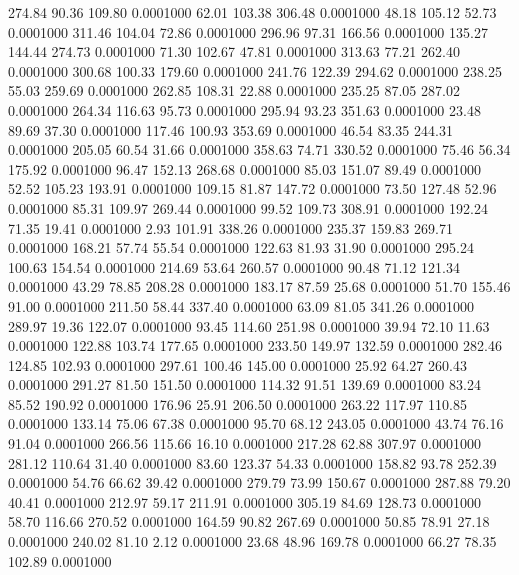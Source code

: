  274.84   90.36  109.80   0.0001000
  62.01  103.38  306.48   0.0001000
  48.18  105.12   52.73   0.0001000
 311.46  104.04   72.86   0.0001000
 296.96   97.31  166.56   0.0001000
 135.27  144.44  274.73   0.0001000
  71.30  102.67   47.81   0.0001000
 313.63   77.21  262.40   0.0001000
 300.68  100.33  179.60   0.0001000
 241.76  122.39  294.62   0.0001000
 238.25   55.03  259.69   0.0001000
 262.85  108.31   22.88   0.0001000
 235.25   87.05  287.02   0.0001000
 264.34  116.63   95.73   0.0001000
 295.94   93.23  351.63   0.0001000
  23.48   89.69   37.30   0.0001000
 117.46  100.93  353.69   0.0001000
  46.54   83.35  244.31   0.0001000
 205.05   60.54   31.66   0.0001000
 358.63   74.71  330.52   0.0001000
  75.46   56.34  175.92   0.0001000
  96.47  152.13  268.68   0.0001000
  85.03  151.07   89.49   0.0001000
  52.52  105.23  193.91   0.0001000
 109.15   81.87  147.72   0.0001000
  73.50  127.48   52.96   0.0001000
  85.31  109.97  269.44   0.0001000
  99.52  109.73  308.91   0.0001000
 192.24   71.35   19.41   0.0001000
   2.93  101.91  338.26   0.0001000
 235.37  159.83  269.71   0.0001000
 168.21   57.74   55.54   0.0001000
 122.63   81.93   31.90   0.0001000
 295.24  100.63  154.54   0.0001000
 214.69   53.64  260.57   0.0001000
  90.48   71.12  121.34   0.0001000
  43.29   78.85  208.28   0.0001000
 183.17   87.59   25.68   0.0001000
  51.70  155.46   91.00   0.0001000
 211.50   58.44  337.40   0.0001000
  63.09   81.05  341.26   0.0001000
 289.97   19.36  122.07   0.0001000
  93.45  114.60  251.98   0.0001000
  39.94   72.10   11.63   0.0001000
 122.88  103.74  177.65   0.0001000
 233.50  149.97  132.59   0.0001000
 282.46  124.85  102.93   0.0001000
 297.61  100.46  145.00   0.0001000
  25.92   64.27  260.43   0.0001000
 291.27   81.50  151.50   0.0001000
 114.32   91.51  139.69   0.0001000
  83.24   85.52  190.92   0.0001000
 176.96   25.91  206.50   0.0001000
 263.22  117.97  110.85   0.0001000
 133.14   75.06   67.38   0.0001000
  95.70   68.12  243.05   0.0001000
  43.74   76.16   91.04   0.0001000
 266.56  115.66   16.10   0.0001000
 217.28   62.88  307.97   0.0001000
 281.12  110.64   31.40   0.0001000
  83.60  123.37   54.33   0.0001000
 158.82   93.78  252.39   0.0001000
  54.76   66.62   39.42   0.0001000
 279.79   73.99  150.67   0.0001000
 287.88   79.20   40.41   0.0001000
 212.97   59.17  211.91   0.0001000
 305.19   84.69  128.73   0.0001000
  58.70  116.66  270.52   0.0001000
 164.59   90.82  267.69   0.0001000
  50.85   78.91   27.18   0.0001000
 240.02   81.10    2.12   0.0001000
  23.68   48.96  169.78   0.0001000
  66.27   78.35  102.89   0.0001000
